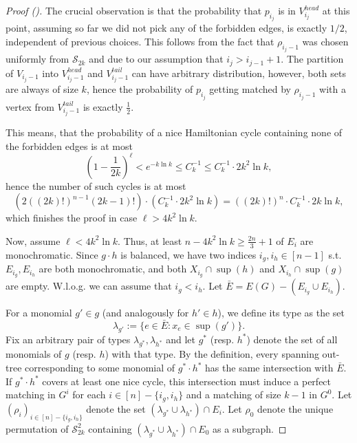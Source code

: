 \documentclass[11pt,a4paper]{article}
\newcommand{\sym}{\mathcal{S}}
\begin{document}
\begin{proof}[Proof ()]
    The crucial observation is that the probability that $p_{i_j}$ is in $V_{i_j}^{head}$ at this point, assuming so far we did not pick any of the forbidden edges, is exactly $1/2$, independent of previous choices. This follows from the fact that $\rho_{i_j - 1}$ was chosen uniformly from $\sym_{2k}$ and due to our assumption that $i_j > i_{j - 1} + 1$. The partition of $V_{i_j - 1}$ into $V_{i_j - 1}^{head}$ and $V_{i_j - 1}^{tail}$ can have arbitrary distribution, however, both sets are always of size $k$, hence the probability of $p_{i_j}$ getting matched by $\rho_{i_j - 1}$ with a vertex from $V_{i_j - 1}^{tail}$ is exactly $\frac{1}{2}$.

    This means, that the probability of a nice Hamiltonian cycle containing none of the forbidden edges is at most
    $$
    \left( 1 - \frac{1}{2k} \right)^\ell < e^{-k \ln k} \leq C_k^{-1} \leq C_k^{-1} \cdot 2k^2 \ln k,
    $$
    hence the number of such cycles is at most
    $$
    \left( 2 ((2k)!)^{n-1} (2k - 1)! \right) 
        \cdot \left( C_k^{-1} \cdot 2k^2 \ln k \right) =
    ((2k)!)^n \cdot C_k^{-1} \cdot 2k \ln k,
    $$
    which finishes the proof in case $\ell > 4k^2 \ln k$.
    \newline
    

    Now, assume $\ell < 4k^2 \ln k$. Thus, at least $n - 4k^2 \ln k \geq \frac{2n}{3} + 1$ of $E_i$ are monochromatic. Since $g \cdot h$ is balanced, we have two indices $i_g, i_h \in [n - 1]$ s.t. $E_{i_g}, E_{i_h}$ are both monochromatic, and both $X_{i_g} \cap \sup(h)$ and  $X_{i_h} \cap \sup(g)$ are empty. W.l.o.g. we can assume that $i_g < i_h$. Let $\bar{E} = E(G) - (E_{i_g} \cup E_{i_h})$.

    For a monomial $g' \in g$ (and analogously for $h' \in h$), we define its type as the set
    $$
        \lambda_{g'} := \{ e \in \bar{E} : x_e \in \sup(g') \}.
    $$
    Fix an arbitrary pair of types $\lambda_{g^*}, \lambda_{h^*}$ and let $g^*$ (resp. $h^*$) denote the set of all monomials of $g$ (resp. $h$) with that type. By the definition, every spanning out-tree corresponding to some monomial of $g^* \cdot h^*$ has the same intersection with $\bar{E}$. If $g^* \cdot h^*$ covers at least one nice cycle, this intersection must induce a perfect matching in $G^i$ for each $i \in [n] - \{i_g, i_h\}$ and a matching of size $k - 1$ in $G^0$.
    Let $(\rho_i)_{i \in [n] - \{i_g, i_h\}}$ denote the set $(\lambda_{g^*} \cup \lambda_{h^*}) \cap E_i$. Let $\rho_0$ denote the unique permutation of $\sym_{2k}^2$ containing $(\lambda_{g^*} \cup \lambda_{h^*}) \cap E_0$ as a subgraph.
    

\end{proof}
\end{document}
